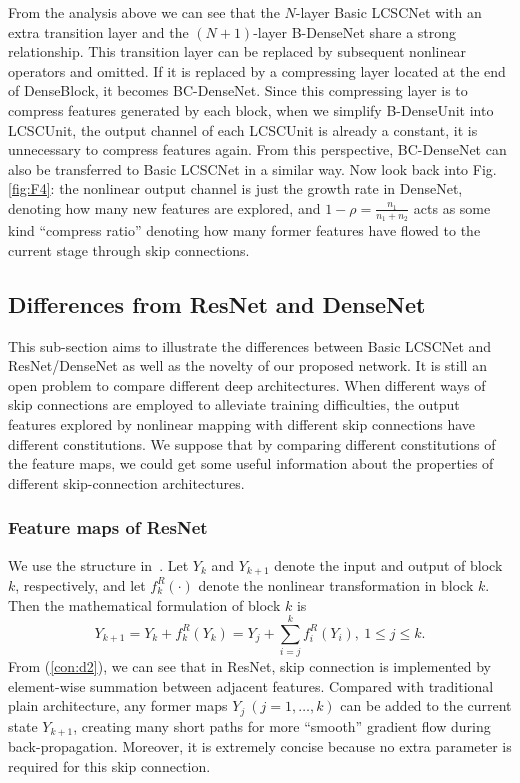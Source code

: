 \documentclass[journal]{IEEEtran}
\begin{document}
From the analysis above we can see that the $N$-layer Basic LCSCNet with an extra transition layer and the $(N+1)$-layer B-DenseNet share a strong relationship. This transition layer can be replaced by subsequent nonlinear operators and omitted. If it is replaced by a compressing layer located at the end of DenseBlock, it becomes BC-DenseNet. Since this compressing layer is to compress features generated by each block, when we simplify B-DenseUnit into LCSCUnit, the output channel of each LCSCUnit is already a constant, it is unnecessary to compress features again. From this perspective, BC-DenseNet can also be transferred to Basic LCSCNet in a similar way. Now look back into Fig.\ref{fig:F4}: the nonlinear output channel is just the growth rate in DenseNet, denoting how many new features are explored, and $1-\rho=\frac{n_{1}}{n_{1}+n_{2}}$ acts as some kind ``compress ratio'' denoting how many former features have flowed to the current stage through skip connections. 

\subsection{Differences from ResNet and DenseNet}
This sub-section aims to illustrate the differences between  Basic LCSCNet and ResNet/DenseNet as well as the novelty of our proposed network. It is still an open problem to compare different deep architectures. When different ways of skip connections are employed to alleviate training difficulties, the output features explored by nonlinear mapping with different skip connections have different constitutions. We suppose that by comparing different constitutions of the feature maps, we could get some useful information about the properties of different skip-connection architectures.

\subsubsection{Feature maps of ResNet} 

We use the structure in~\cite{he2016identity}. Let $Y_{k}$ and $Y_{k+1}$ denote the input and output of block $k$, respectively, and let $f_{k}^{R}(\cdot)$ denote the nonlinear transformation in block $k$. Then the mathematical formulation of block $k$ is
\begin{equation}
Y_{k+1}=Y_{k} + f_{k}^{R}(Y_{k}) =Y_{j} + \sum_{i=j}^{k}f_{i}^{R}(Y_{i}),\ 1 \leq j \leq k. 
\label{con:d2}
\end{equation}
From (\ref{con:d2}), we can see that in ResNet, skip connection is implemented by element-wise summation between adjacent features. Compared with traditional plain architecture, any former maps $Y_{j} \ (j=1,\ldots,k)$ can be added to the current state $Y_{k+1}$, creating many short paths for more ``smooth'' gradient flow during back-propagation. Moreover, it is extremely concise because no extra parameter is required for this skip connection. 
\end{document}
